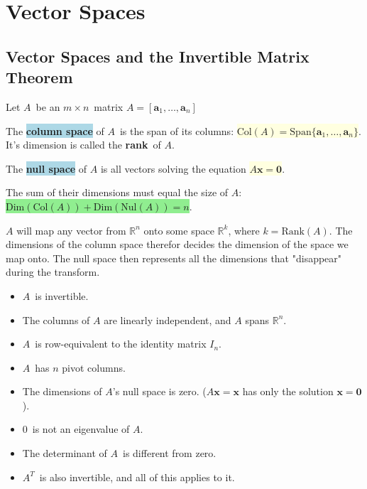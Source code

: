 \documentclass[12p,a4paper]{report}
\renewcommand{\b}{\boldsymbol}
\newcommand{\m}{\mathbb}
\newcommand{\yll}{\colorbox{lightyellow}}
\newcommand{\grr}{\colorbox{lightgreen}}
\newcommand{\bll}{\colorbox{lightblue}}
\begin{document}
                                                                  
\setcounter{chapter}{3}
\chapter{Vector Spaces}
\section{Vector Spaces and the Invertible Matrix Theorem}
Let $A$ be an $m \times n$ matrix $A=[\b a_1, \dots , \b a_n]$

The \bll{\textbf{column space}} of $A$ is the span of its columns: \yll{$\text{Col}(A) = \text{Span}\{\b a_1, \dots , \b a_n\}$}. It's dimension is called the \textbf{rank} of $A$.

The \bll{\textbf{null space}} of $A$ is all vectors solving the equation \yll{$A \b x = \b 0$}.

The sum of their dimensions must equal the size of $A$: \grr{$\text{Dim}(\text{Col}(A)) + \text{Dim}(\text{Nul}(A)) = n$}.


$A$ will map any vector from $\m R^n$ onto some space $\m R^k$, where $k = \text{Rank}(A)$. The dimensions of the column space therefor decides the dimension of the space we map onto. The null space then represents all the dimensions that "disappear" during the transform.

\begin{tcolorbox}[title={The Invertible Matrix Theorem}]
\begin{itemize}
    \item $A$ is invertible.
    \item The columns of $A$ are linearly independent, and $A$ spans $\m R^n$.
    \item $A$ is row-equivalent to the identity matrix $I_n$.
    \item $A$ has $n$ pivot columns.
    \item The dimensions of $A$'s null space is zero. ($A\b x = \b x$ has only the solution $\b x = \b 0$).
    \item $0$ is not an eigenvalue of $A$.
    \item The determinant of $A$ is different from zero.
    \item $A^T$ is also invertible, and all of this applies to it.
\end{itemize}

\end{tcolorbox}
\end{document}
